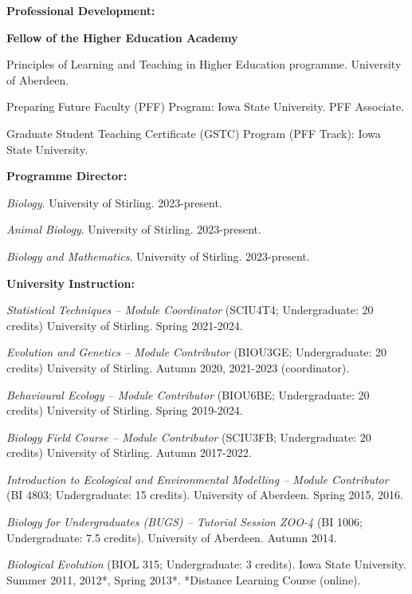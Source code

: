\documentclass[letterpaper]{article}
\renewenvironment{itemize}{
  \begin{list}{}{
    \setlength{\leftmargin}{1.5em}
  }
}{
  \end{list}
}
\begin{document}
\begin{itemize}
\item {\bf Professional Development:}
\begin{itemize}
\item[$\bullet$]{{\bf Fellow of the Higher Education Academy}}
\item[$\bullet$]{Principles of Learning and Teaching in Higher Education programme. University of Aberdeen.}
\item[$\bullet$]{Preparing Future Faculty (PFF) Program: Iowa State University. PFF Associate.}
\item[$\bullet$]{Graduate Student Teaching Certificate (GSTC) Program (PFF Track): Iowa State University.}
\end{itemize}

\item {\bf Programme Director:}
\begin{itemize}
\item[$\bullet$]{{\it Biology}. University of Stirling. 2023-present.}
\item[$\bullet$]{{\it Animal Biology}. University of Stirling. 2023-present.}
\item[$\bullet$]{{\it Biology and Mathematics}. University of Stirling. 2023-present.}
\end{itemize}

\item {\bf University Instruction:}
\begin{itemize}
\item[$\bullet$]{{\it Statistical Techniques -- Module Coordinator} (SCIU4T4; Undergraduate: 20 credits) University of Stirling. Spring 2021-2024.}
\item[$\bullet$]{{\it Evolution and Genetics -- Module Contributor} (BIOU3GE; Undergraduate: 20 credits) University of Stirling. Autumn 2020, 2021-2023 (coordinator).}
\item[$\bullet$]{{\it Behavioural Ecology -- Module Contributor} (BIOU6BE; Undergraduate: 20 credits) University of Stirling. Spring 2019-2024.}
\item[$\bullet$]{{\it Biology Field Course -- Module Contributor} (SCIU3FB; Undergraduate: 20 credits) University of Stirling. Autumn 2017-2022.}
\item[$\bullet$]{{\it Introduction to Ecological and Environmental Modelling -- Module Contributor} (BI 4803; Undergraduate: 15 credits). University of Aberdeen. Spring 2015, 2016.}
\item[$\bullet$]{{\it Biology for Undergraduates (BUGS) -- Tutorial Session ZOO-4} (BI 1006; Undergraduate: 7.5 credits). University of Aberdeen. Autumn 2014.}
\item[$\bullet$]{{\it Biological Evolution} (BIOL 315; Undergraduate: 3 credits). Iowa State University. Summer 2011, 2012*, Spring 2013*. *Distance Learning Course (online).}
\end{itemize}


\end{itemize}
\end{document}
